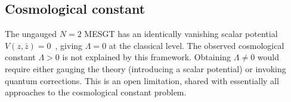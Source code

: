 \subsection{Cosmological constant}

The ungauged $N{=}2$ MESGT has an identically vanishing scalar potential
$V(z, \bar{z}) = 0$~\cite{LauriaVanProeyen2020}, giving $\Lambda = 0$
at the classical level. The observed cosmological constant
$\Lambda > 0$ is not explained by this framework. Obtaining $\Lambda
\neq 0$ would require either gauging the theory (introducing a scalar
potential) or invoking quantum corrections. This is an open limitation,
shared with essentially all approaches to the cosmological constant
problem.
